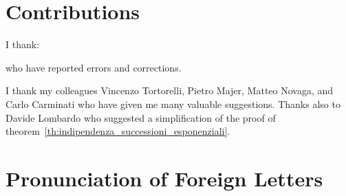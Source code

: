 \section*{Contributions}

I thank:
%

%
who have reported errors and corrections.

I thank my colleagues Vincenzo Tortorelli, Pietro Majer, Matteo Novaga, and
Carlo Carminati who have given me many valuable suggestions. Thanks also to
Davide Lombardo who suggested a simplification of the proof of
theorem~\ref{th:indipendenza_successioni_esponenziali}.

\newpage

\section*{Pronunciation of Foreign Letters}

